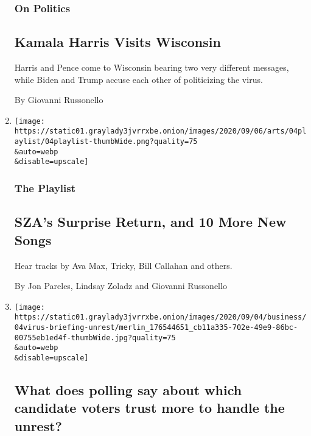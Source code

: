 \begin{enumerate}
  \hypertarget{on-politics-1}{%
  \subsubsection{On Politics}\label{on-politics-1}}

  \hypertarget{kamala-harris-visits-wisconsin}{%
  \subsection{Kamala Harris Visits
  Wisconsin}\label{kamala-harris-visits-wisconsin}}

  Harris and Pence come to Wisconsin bearing two very different
  messages, while Biden and Trump accuse each other of politicizing the
  virus.

  By Giovanni Russonello
\item
  \href{/2020/09/04/arts/music/playlist-sza-ty-dolla-sign-finneas.html}{}

  \texttt{[image: https://static01.graylady3jvrrxbe.onion/images/2020/09/06/arts/04playlist/04playlist-thumbWide.png?quality=75\\\&auto=webp\\\&disable=upscale]}

  \hypertarget{the-playlist}{%
  \subsubsection{The Playlist}\label{the-playlist}}

  \hypertarget{szas-surprise-return-and-10-more-new-songs}{%
  \subsection{SZA's Surprise Return, and 10 More New
  Songs}\label{szas-surprise-return-and-10-more-new-songs}}

  Hear tracks by Ava Max, Tricky, Bill Callahan and others.

  By Jon Pareles, Lindsay Zoladz and Giovanni Russonello
\item
  \href{/2020/09/04/us/elections/what-does-polling-say-about-which-candidate-voters-trust-more-to-handle-the-unrest.html}{}

  \texttt{[image: https://static01.graylady3jvrrxbe.onion/images/2020/09/04/business/04virus-briefing-unrest/merlin\_176544651\_cb11a335-702e-49e9-86bc-00755eb1ed4f-thumbWide.jpg?quality=75\\\&auto=webp\\\&disable=upscale]}

  \hypertarget{what-does-polling-say-about-which-candidate-voters-trust-more-to-handle-the-unrest}{%
  \subsection{What does polling say about which candidate voters trust
  more to handle the
  unrest?}\label{what-does-polling-say-about-which-candidate-voters-trust-more-to-handle-the-unrest}}


\end{enumerate}
